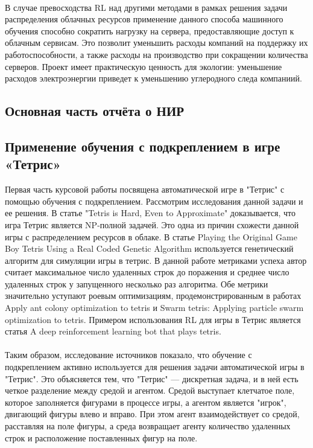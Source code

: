 \documentclass{article}
\begin{document}
~\\
В случае превосходства RL над другими методами в рамках решения задачи распределения облачных ресурсов применение данного способа машинного обучения способно сократить нагрузку на сервера, предоставляющие доступ к облачным сервисам. Это позволит уменьшить расходы компаний на поддержку их работоспособности, а также расходы на производство при сокращении количества серверов. Проект имеет практическую ценность для экологии: уменьшение расходов электроэнергии приведет к уменьшению углеродного следа компаниий.	\\
\newpage
\begin{center}
\section {Основная часть отчёта о НИР}
\end{center}
\begin{center}
\item\subsection{Применение обучения с подкреплением в игре «Тетрис»}
\end{center}
Первая часть курсовой работы посвящена автоматической игре в "Тетрис" с помощью обучения с подкреплением. Рассмотрим исследования данной задачи и ее решения. В статье "Tetris is Hard, Even to Approximate"\cite{litlink5} доказывается, что игра Тетрис является NP-полной задачей. Это одна из причин схожести данной игры с распределением ресурсов в облаке\cite{litlink6}. В статье Playing the Original Game Boy Tetris Using a Real Coded Genetic Algorithm\cite{litlink7} используется генетический алгоритм для симуляции игры в тетрис. В данной работе метриками успеха автор считает максимальное число удаленных строк до поражения и среднее число удаленных строк у запущенного несколько раз алгоритма. Обе метрики значительно уступают роевым оптимизациям,  продемонстрированным в работах Apply ant colony optimization to tetris\cite{litlink8} и Swarm tetris: Applying particle swarm optimization to tetris\cite{litlink9}. Примером использования RL для игры в Тетрис является статья A deep reinforcement learning bot that plays tetris\cite{litlink10}.\\~\\
Таким образом, исследование источников показало, что обучение с подкреплением активно используется для решения задачи автоматической игры в "Тетрис". Это объясняется тем, что "Тетрис" — дискретная задача, и в ней есть четкое разделение между средой и агентом. Средой выступает клетчатое поле, которое заполняется фигурами в процессе игры, а агентом является "игрок", двигающий фигуры влево и вправо. При этом агент взаимодействует со средой, расставляя на поле фигуры, а среда возвращает агенту количество удаленных строк и расположение поставленных фигур на поле.\\~\\
\end{document}
